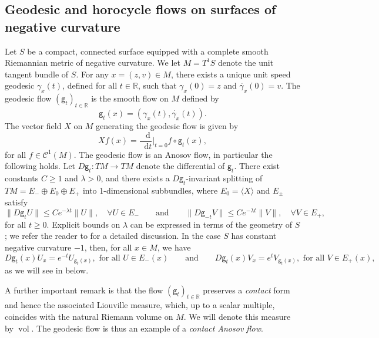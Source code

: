 \documentclass[11pt,letterpaper]{amsart}
\newcommand \R {{ \mathbb R}}
\newcommand{\geo}{\mathsf{g}}
\newcommand*{\diff}{\mathop{}\!\mathrm{d}}
\DeclareMathOperator{\vol}{vol}
\theoremstyle{definition}
\begin{document}
\subsection{Geodesic and horocycle flows on surfaces of negative curvature}\label{sec:geo_horo_basics}
Let $S$ be a compact, connected surface equipped with a complete smooth Riemannian metric of negative curvature. 
We let $M = T^1S$ denote the unit tangent bundle of $S$. For any $x = (z,v) \in M$, there exists a unique unit speed geodesic $\gamma_x(t)$, defined for all $t \in \R$, such that $\gamma_x(0) = z$ and $\dot{\gamma_x}(0)=v$.
The geodesic flow $(\geo_t)_{t \in \R}$ is the smooth flow on $M$ defined by 
\[
\geo_t(x) = (\gamma_x(t), \dot{\gamma_x}(t)).
\]
The vector field $X$ on $M$ generating the geodesic flow is given by 
\[
Xf(x) = \frac{\diff}{\diff t} \Big\vert_{t=0} f \circ \geo_t(x),
\]
for all $f\in \mathscr{C}^1(M)$. 
The geodesic  flow is an Anosov flow, in particular the following holds. 
Let $D\geo_t \colon TM \to TM$ denote the differential of $\geo_t$. There exist constants $C \geq 1$ and $\lambda>0$, and there exists a $D\geo_t$-invariant splitting of $TM = E_{-} \oplus E_0 \oplus E_{+}$ into 1-dimensional subbundles, where  $E_0 = \langle X \rangle$ and $E_{\pm}$ satisfy
\begin{equation}\label{eq:hyperb}
\| D\geo_t U\| \leq C e^{-\lambda t} \|U\|,\quad \forall U \in E_{-} \qquad \text{and} \qquad \| D\geo_{-t} V\| \leq C e^{-\lambda t} \|V\|, \quad \forall V \in E_{+},
\end{equation}
for all $t\geq 0$. Explicit bounds on $\lambda$ can be expressed in terms of the geometry of $S$; we refer the reader to \cite[Part IV, \S 17.6]{HasKat} for a detailed discussion.
In the case $S$ has constant negative curvature $-1$, then, for all $x \in M$, we have
\[
D\geo_t(x) U_x = e^{-t} U_{\geo_t(x)}, \text{\ for all $U \in E_{-}(x)$} \qquad \text{and} \qquad D\geo_t(x) V_x = e^{t} V_{\geo_t(x)}, \text{\ for all $V \in E_{+}(x)$},
\]
as we will see in  below.

A further important remark is that the flow $(\geo_t)_{t \in \R}$ preserves a \emph{contact} form and hence the associated Liouville measure, which, up to a scalar multiple, coincides with the natural Riemann volume on $M$. We will denote this measure by $\vol$. The geodesic flow is thus an example of a \emph{contact Anosov flow}.
\end{document}
